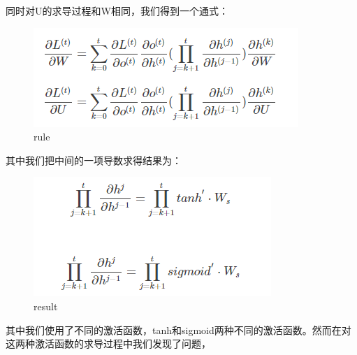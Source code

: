 \documentclass{article}
\begin{document}
同时对U的求导过程和W相同，我们得到一个通式：

\begin{figure}
  \centering
  \includegraphics[width=.8\textwidth]{rule.png} %
  \caption{rule}
  \label{fig:fig1}
\end{figure}


其中我们把中间的一项导数求得结果为：

\begin{figure}
  \centering
  \includegraphics[width=.8\textwidth]{result.png} %
  \caption{result}
  \label{fig:fig1}
\end{figure}

其中我们使用了不同的激活函数，tanh和sigmoid两种不同的激活函数。然而在对这两种激活函数的求导过程中我们发现了问题，
\end{document}
